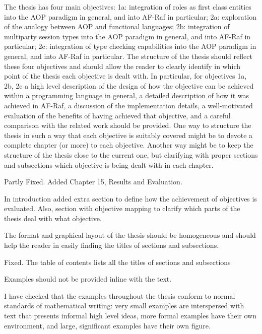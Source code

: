 \documentclass{article}
\newenvironment{them}{\noindent\begingroup\color{blue}}{\endgroup\par}
\begin{document}
\begin{them}

The thesis has four main objectives: 1a: integration of roles as first class
entities into the AOP paradigm in general, and into AF-Raf in particular; 2a:
exploration of the analogy between AOP and functional languages; 2b:
integration of multiparty session types into the AOP paradigm in general, and
into AF-Raf in particular; 2c: integration of type checking capabilities into
the AOP paradigm in general, and into AF-Raf in particular.  The structure of
the thesis should reflect these four objectives and should allow the reader to
clearly identify in which point of the thesis each objective is dealt with. In
particular, for objectives 1a, 2b, 2c a high level description of the design of
how the objective can be achieved within a programming language in general, a
detailed description of how it was achieved in AF-Raf, a discussion of the
implementation details, a well-motivated evaluation of the benefits of having
achieved that objective, and a careful comparison with the related work should
be provided.  One way to structure the thesis in such a way that each objective
is suitably covered might be to devote a complete chapter (or more) to each
objective. Another way might be to keep the structure of the thesis close to
the current one, but clarifying with proper sections and subsections which
objective is being dealt with in each chapter.

\end{them}
Partly Fixed. Added Chapter 15, Results and Evaluation.

In introduction added extra section to define how the achievement of objectives is evaluated. Also, section with objective mapping to clarify which parts of the thesis deal with what objective.

\begin{them}

The format and graphical layout of the thesis should be homogeneous and should
help the reader in easily finding the titles of sections and subsections.

\end{them}
Fixed. The table of contents lists all the titles of sections and subsections

\begin{them}

 Examples should not be provided inline with the text.
\end{them}

I have checked that the examples throughout the thesis conform to  normal
standards of mathematical writing: very small examples are interspersed with
text that presents informal high level ideas, more formal examples have their
own environment, and large, significant examples have their own figure.
\end{document}
